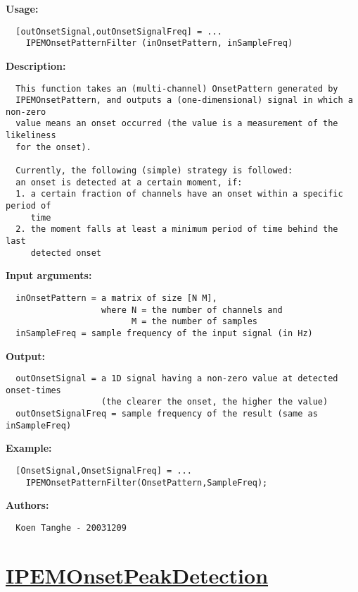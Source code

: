 \textbf{Usage:}
\begin{verbatim}  [outOnsetSignal,outOnsetSignalFreq] = ...
    IPEMOnsetPatternFilter (inOnsetPattern, inSampleFreq)

\end{verbatim}
\textbf{Description:}
\begin{verbatim}  This function takes an (multi-channel) OnsetPattern generated by 
  IPEMOnsetPattern, and outputs a (one-dimensional) signal in which a non-zero
  value means an onset occurred (the value is a measurement of the likeliness
  for the onset).

  Currently, the following (simple) strategy is followed:
  an onset is detected at a certain moment, if:
  1. a certain fraction of channels have an onset within a specific period of
     time
  2. the moment falls at least a minimum period of time behind the last
     detected onset

\end{verbatim}
\textbf{Input arguments:}
\begin{verbatim}  inOnsetPattern = a matrix of size [N M],
                   where N = the number of channels and
                         M = the number of samples
  inSampleFreq = sample frequency of the input signal (in Hz)

\end{verbatim}
\textbf{Output:}
\begin{verbatim}  outOnsetSignal = a 1D signal having a non-zero value at detected onset-times
                   (the clearer the onset, the higher the value)
  outOnsetSignalFreq = sample frequency of the result (same as inSampleFreq)

\end{verbatim}
\textbf{Example:}
\begin{verbatim}  [OnsetSignal,OnsetSignalFreq] = ...
    IPEMOnsetPatternFilter(OnsetPattern,SampleFreq);

\end{verbatim}
\textbf{Authors:}
\begin{verbatim}  Koen Tanghe - 20031209
\end{verbatim}


\newpage
\section*{\hyperlink{Concepts:IPEMOnsetPeakDetection}{IPEMOnsetPeakDetection}}
\hypertarget{FuncRef:IPEMOnsetPeakDetection}{}


